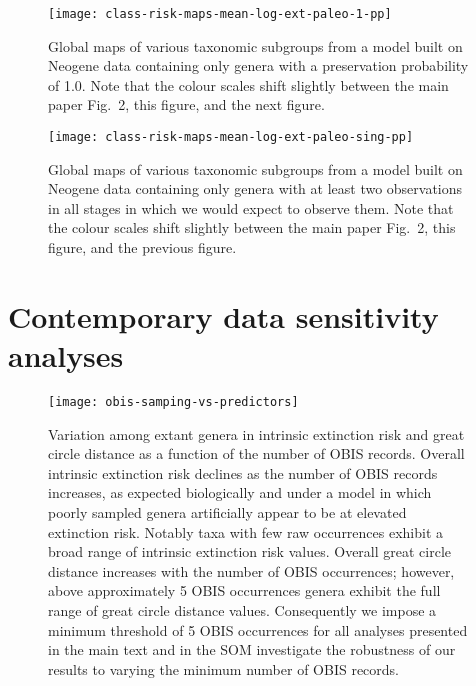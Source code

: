 \documentclass[11pt]{article}
\begin{document}
\begin{figure}[htbp]
\begin{center}
\texttt{[image: class-risk-maps-mean-log-ext-paleo-1-pp]}
\caption{Global maps of various taxonomic subgroups from a model built on Neogene data containing only genera with a preservation probability of 1.0. Note that the colour scales shift slightly between the main paper Fig.\ 2, this figure, and the next figure.}
\label{fig:class-maps-paleo-cull-1-pp}
\end{center}
\end{figure}

\begin{figure}[htbp]
\begin{center}
\texttt{[image: class-risk-maps-mean-log-ext-paleo-sing-pp]}
\caption{Global maps of various taxonomic subgroups from a model built on Neogene data containing only genera with at least two observations in all stages in which we would expect to observe them. Note that the colour scales shift slightly between the main paper Fig.\ 2, this figure, and the previous figure.}
\label{fig:class-maps-paleo-sing-pp}
\end{center}
\end{figure}

\clearpage

\section{Contemporary data sensitivity analyses}

\begin{figure}[htbp]
\begin{center}
\texttt{[image: obis-samping-vs-predictors]}
\caption{Variation among extant genera in intrinsic extinction risk and great circle distance as a function of the number of OBIS records. Overall intrinsic extinction risk declines as the number of OBIS records increases, as expected biologically and under a model in which poorly sampled genera artificially appear to be at elevated extinction risk. Notably taxa with few raw occurrences exhibit a broad range of intrinsic extinction risk values. Overall great circle distance increases with the number of OBIS occurrences; however, above approximately 5 OBIS occurrences genera exhibit the full range of great circle distance values. Consequently we impose a minimum threshold of 5 OBIS occurrences for all analyses presented in the main text and in the SOM investigate the robustness of our results to varying the minimum number of OBIS records.}
\label{fig:obis-sampling-vs-predictors}
\end{center}
\end{figure}
\end{document}
